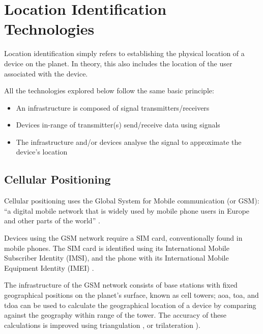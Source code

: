 \section{Location Identification Technologies}

Location identification simply refers to establishing the
physical location of a device on the planet.
In theory, this also includes the location of the user
associated with the device.

All the technologies explored below follow the same basic
principle: 

\begin{itemize} 

  \item An infrastructure is composed of signal
        transmitters/receivers 

  \item Devices in-range of transmitter(s) send/receive data
        using signals 

  \item The infrastructure and/or devices analyse the signal
        to approximate the device's location 

\end{itemize} 

\subsection{Cellular Positioning} \label{ss:cellPos}
Cellular positioning uses the Global System for Mobile
communication (or GSM): \enquote{a digital mobile network
  that is widely used by mobile phone users in Europe and
  other parts of the world} \parencite{whatIsGSM}.

Devices using the GSM network require a SIM card,
conventionally found in mobile phones.
The SIM card is identified using its International Mobile
Subscriber Identity (IMSI), and the phone with its
International Mobile Equipment Identity (IMEI)
\parencite{trackingSuspectByPhone}.

The infrastructure of the GSM network consists of base
stations with fixed geographical positions on the planet's
surface, known as cell towers; \gls{aoa}, \gls{toa}, and
\gls{tdoa} can be used to calculate the geographical
location of a device by comparing against the geography
within range of the tower.
The accuracy of these calculations is improved using
\gls{triangulation} \parencite{howCellTowerTriWorks}, or
\gls{trilateration} \parencite{suveryOfCellPos}).

